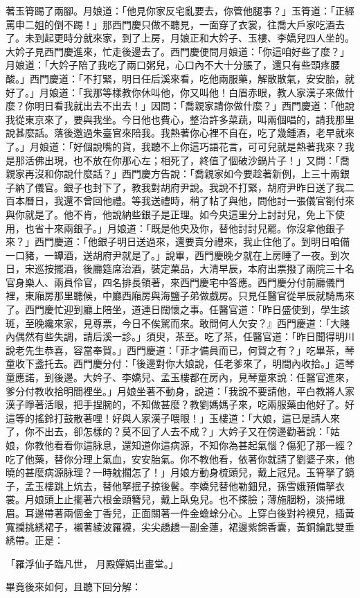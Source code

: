 著玉筲踢了兩腳。月娘道：「他見你家反宅亂要去，你管他腿事？」玉筲道：「正經罵申二姐的倒不踢！」那西門慶只做不聽見，一面穿了衣裳，往喬大戶家吃酒去了。未到起更時分就來家，到了上房，月娘正和大妗子、玉樓、李嬌兒四人坐的。大妗子見西門慶進來，忙走後邊去了。西門慶便問月娘道：「你這咱好些了麼？」月娘道：「大妗子陪了我吃了兩口粥兒，心口內不大十分脹了，還只有些頭疼腰酸。」西門慶道：「不打緊，明日任后溪來看，吃他兩服藥，解散散氣，安安胎，就好了。」月娘道：「我那等樣教你休叫他，你又叫他！白眉赤眼，教人家漢子來做什麼？你明日看我就出去不出去！」因問：「喬親家請你做什麼？」西門慶道：「他說我從東京來了，要與我坐。今日他也費心，整治許多菜蔬，叫兩個唱的，請我那里說甚麼話。落後邀過朱臺官來陪我。我熱著你心裡不自在，吃了幾鍾酒，老早就來了。」月娘道：「好個說嘴的貨，我聽不上你這巧語花言，可可兒就是熱著我來？我是那活佛出現，也不放在你那心左；相死了，終值了個破沙鍋片子！」又問：「喬親家再沒和你說什麼話？」西門慶方告說：「喬親家如今要趁著新例，上三十兩銀子納了儀官。銀子也封下了，教我對胡府尹說。我說不打緊，胡府尹昨日送了我二百本曆日，我還不曾回他禮。等我送禮時，稍了帖了與他，問他討一張儀官劄付來與你就是了。他不肯，他說納些銀子是正理。如今央這里分上討討兒，免上下使用，也省十來兩銀子。」月娘道：「既是他央及你，替他討討兒罷。你沒拿他銀子來？」西門慶道：「他銀子明日送過來，還要賣分禮來，我止住他了。到明日咱備一口豬，一罈酒，送胡府尹就是了。」說畢，西門慶晚夕就在上房睡了一夜。到次日，宋巡按擺酒，後廳筵席治酒，裝定菓品，大清早辰，本府出票撥了兩院三十名官身樂人、兩員伶官，四名排長領著，來西門慶宅中答應。西門慶分付前廳儀門裡，東廂房那里聽候，中廳西廂房與海鹽子弟做戲房。只見任醫官從早辰就騎馬來了。西門慶忙迎到廳上陪坐，道連日闊懷之事。任醫官道：「昨日盛使到，學生該斑，至晚纔來家，見尊票，今日不俟駕而來。敢問何人欠安？』西門慶道：「大賤內偶然有些失調，請后溪一診。」須臾，茶至。吃了茶，任醫官道：「昨日聞得明川說老先生恭喜，容當奉賀。」西門慶道：「菲才備員而已，何賀之有？」吃畢茶，琴童收下盞托去。西門慶分付：「後邊對你大娘說，任老爹來了，明間內收拾。」這琴童應諾，到後邊。大妗子、李嬌兒、孟玉樓都在房內，見琴童來說：任醫官進來，爹分付教收拾明間裡坐。」月娘坐著不動身，說道：「我說不要請他，平白教將人家漢子睜著活眼，把手捏腕的，不知做甚麼？教劉媽媽子來，吃兩服藥由他好了。好這等的搖鈴打鼓散著哩！好與人家漢子喂眼！」玉樓道：「大娘，這已是請人來了，你不出去，卻怎樣的？莫不回了人去不成？」大妗子又在傍邊勸著說：「姑娘，你教他看看你這脉息，還知道你這病源，不知你為甚起氣惱？傷犯了那一經？吃了他藥，替你分理上氣血，安安胎氣。你不教他看，依著你就請了劉婆子來，他曉的甚麼病源脉理？一時躭擱怎了！」月娘方動身梳頭兒，戴上冠兒。玉筲拏了鏡子，孟玉樓跳上炕去，替他拏抿子掠後鬢。李嬌兒替他勒鈿兒，孫雪娥預備拏衣裳。月娘頭上止擺著六根金頭簪兒，戴上臥兔兒。也不搽臉；薄施胭粉，淡掃蛾眉。耳邊帶著兩個金丁香兒，正面關著一件金蟾蜍分心。上穿白後對衿襖兒，插黃寬攔挑綉裙子，襯著綾波羅襪，尖尖趫趫一副金蓮，裙邊紫錦香囊，黃銅鑰匙雙垂綉帶。正是：

「羅浮仙子臨凡世，  月殿嬋娟出畫堂。」

畢竟後來如何，且聽下回分解：

